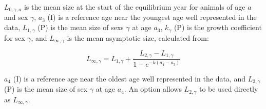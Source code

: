 \documentclass[11pt,
  english,
  letterpaper,
]{article}
\begin{document}
{\(L_{0,\gamma, a}\)\leavevmode\tagmcend\tagstructend} is the mean size at the start of the equilibrium year for animals of age {\(a\)\leavevmode\tagmcend\tagstructend} and sex {\(\gamma\)\leavevmode\tagmcend\tagstructend}, {\(a_3\)\leavevmode\tagmcend\tagstructend} (I) is a reference age near the youngest age well represented in the data, {\(L_{1,\gamma}\)\leavevmode\tagmcend\tagstructend} (P) is the mean size of sexs {\(\gamma\)\leavevmode\tagmcend\tagstructend} at age {\(a_3\)\leavevmode\tagmcend\tagstructend}, {\(k_{\gamma}\)\leavevmode\tagmcend\tagstructend} (P) is the growth coefficient for sex {\(\gamma\)\leavevmode\tagmcend\tagstructend}, and {\(L_{\infty,\gamma}\)\leavevmode\tagmcend\tagstructend} is the mean asymptotic size, calculated from:

\leavevmode\tagmcend\tagstructend\par


\begin{equation}
\label{eqn7}
L_{\infty,\gamma} = L_{1,\gamma} + \frac{L_{2,\gamma} - L_{1,\gamma}}{1 - e^{-k(a_4 - a_3)}}
\end{equation}

\leavevmode\tagmcend\tagstructend\par


{\(a_4\)\leavevmode\tagmcend\tagstructend} (I) is a reference age near the oldest age well represented in the data, and {\(L_{2,\gamma}\)\leavevmode\tagmcend\tagstructend} (P) is the mean size of sex {\(\gamma\)\leavevmode\tagmcend\tagstructend} at age {\(a_4\)\leavevmode\tagmcend\tagstructend}. An option allows {\(L_{2,\gamma}\)\leavevmode\tagmcend\tagstructend} to be used directly as {\(L_{\infty,\gamma}\)\leavevmode\tagmcend\tagstructend}.
\end{document}
